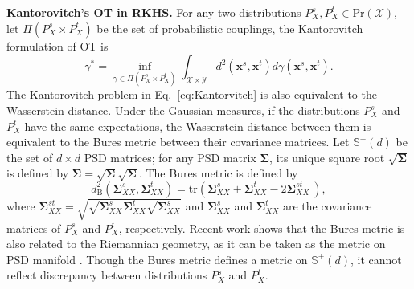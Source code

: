 \documentclass[final]{cvpr}
\newcommand{\MC}{\mathcal}
\newcommand{\MBB}{\mathbb}
\newcommand{\MBF}{\mathbf}
\begin{document}
\textbf{Kantorovitch's OT in RKHS. }
For any two distributions $P^{s}_{X}, P^{t}_{X} \in \text{Pr}(\MC{X})$, let $\Pi(P^{s}_{X} \times P^{t}_{X})$ be the set of probabilistic couplings, the Kantorovitch formulation of OT is
\begin{equation}\label{eq:Kantorvitch}
\gamma^* = \inf_{\gamma \in \Pi(P^{s}_{X} \times P^{t}_{X})} \int_{\MC{X} \times \MC{Y}} d^2(\MBF{x}^s,\MBF{x}^t) d \gamma(\MBF{x}^s,\MBF{x}^t).
\end{equation}
The Kantorovitch problem in Eq.~\eqref{eq:Kantorvitch} is also equivalent to the Wasserstein distance. Under the Gaussian measures, if the distributions $P^{s}_{X}$ and $P^{t}_{X}$ have the same expectations, the Wasserstein distance between them is equivalent to the Bures metric between their covariance matrices. Let $\MBB{S}^+(d)$ be the set of $d \times d$ PSD matrices; for any PSD matrix $\MBF{\Sigma}$, its unique square root $\sqrt{\MBF{\Sigma}}$ is defined by $\MBF{\Sigma}=\sqrt{\MBF{\Sigma}} \sqrt{\MBF{\Sigma}}$. The Bures metric is defined by
\begin{equation*}\label{eq:bures_define}
d_{\text{B}}^2(\MBF{\Sigma}^{s}_{XX},\MBF{\Sigma}^{t}_{XX}) = \text{tr} \left( \MBF{\Sigma}^{s}_{XX} + \MBF{\Sigma}^{t}_{XX} - 2\MBF{\Sigma}^{st}_{XX} ~\right),
\end{equation*}
where $\MBF{\Sigma}^{st}_{XX}=\sqrt{ \sqrt{\MBF{\Sigma}^{s}_{XX}} \MBF{\Sigma}^{t}_{XX} \sqrt{\MBF{\Sigma}^{s}_{XX}} }$ and $\MBF{\Sigma}^{s}_{XX}$ and $\MBF{\Sigma}^{t}_{XX}$ are the covariance matrices of $P^{s}_{X}$ and $P^{t}_{X}$, respectively. Recent work shows that the Bures metric is also related to the Riemannian geometry, as it can be taken as the metric on PSD manifold \cite{bhatia2019bures}. Though the Bures metric defines a metric on $\MBB{S}^+(d)$, it cannot reflect discrepancy between distributions $P^{s}_{X}$ and $P^{t}_{X}$.
\end{document}
